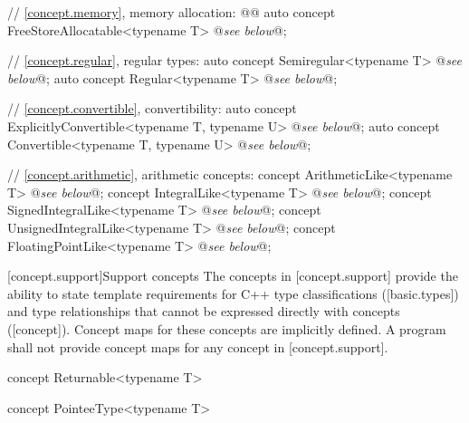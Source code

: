 \documentclass[american,twoside]{book}
\begin{document}
\begin{codeblock}
{  // \ref{concept.memory}, memory allocation:
  @@
  auto concept FreeStoreAllocatable<typename T> @\textit{see below}@;

  // \ref{concept.regular}, regular types:
  auto concept Semiregular<typename T> @\textit{see below}@;
  auto concept Regular<typename T> @\textit{see below}@;

  // \ref{concept.convertible}, convertibility:
  auto concept ExplicitlyConvertible<typename T, typename U> @\textit{see below}@;
  auto concept Convertible<typename T, typename U> @\textit{see below}@;


  // \ref{concept.arithmetic}, arithmetic concepts:
  concept ArithmeticLike<typename T> @\textit{see below}@;
  concept IntegralLike<typename T> @\textit{see below}@;
  concept SignedIntegralLike<typename T> @\textit{see below}@;
  concept UnsignedIntegralLike<typename T> @\textit{see below}@;
  concept FloatingPointLike<typename T> @\textit{see below}@;
}
\end{codeblock}

[concept.support]{Support concepts}
\pnum
The concepts in [concept.support] provide the ability to state
template requirements for C++ type classifications ([basic.types]) and
type relationships that cannot be expressed directly with concepts
([concept]). Concept maps for these concepts are implicitly defined.
A program shall not provide concept maps for any concept in
[concept.support].

\begin{itemdecl}
concept Returnable<typename T> { }
\end{itemdecl}

\begin{itemdescr}
\pnum
{}

\pnum
{}
\end{itemdescr}

\begin{itemdecl}
concept PointeeType<typename T> { }
\end{itemdecl}
\end{document}
